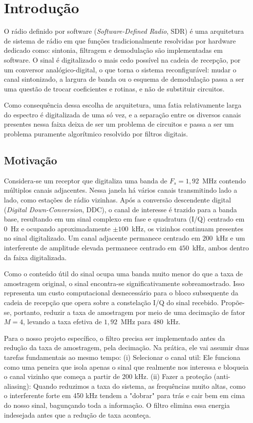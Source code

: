 \chapter{Introdução}
\label{sec:introducao}

O rádio definido por software (\textit{Software-Defined Radio}, SDR) é uma arquitetura de sistema de rádio em que funções tradicionalmente resolvidas por hardware dedicado como: sintonia, filtragem e demodulação são implementadas em software. O sinal é digitalizado o mais cedo possível na cadeia de recepção, por um conversor analógico-digital, o que torna o sistema reconfigurável: mudar o canal sintonizado, a largura de banda ou o esquema de demodulação passa a ser uma questão de trocar coeficientes e rotinas, e não de substituir circuitos.

Como consequência dessa escolha de arquitetura, uma fatia relativamente larga do espectro é digitalizada de uma só vez, e a separação entre os diversos canais presentes nessa faixa deixa de ser um problema de circuitos e passa a ser um problema puramente algorítmico resolvido por filtros digitais.

\section{Motivação}

Considera-se um receptor que digitaliza uma banda de $F_s = 1{,}92$~MHz contendo múltiplos canais adjacentes. Nessa janela há vários canais transmitindo lado a lado, como estações de rádio vizinhas. Após a conversão descendente digital (\textit{Digital Down-Conversion}, DDC), o canal de interesse é trazido para a banda base, resultando em um sinal complexo em fase e quadratura (I/Q) centrado em $0$~Hz e ocupando aproximadamente $\pm 100$~kHz, os vizinhos continuam presentes no sinal digitalizado. Um canal adjacente permanece centrado em $200$~kHz e um interferente de amplitude elevada permanece centrado em $450$~kHz, ambos dentro da faixa digitalizada.

Como o conteúdo útil do sinal ocupa uma banda muito menor do que a taxa de amostragem original, o sinal encontra-se significativamente sobreamostrado. Isso representa um custo computacional desnecessário para o bloco subsequente da cadeia de recepção que opera sobre a constelação I/Q do sinal recebido. Propõe-se, portanto, reduzir a taxa de amostragem por meio de uma decimação de fator $M = 4$, levando a taxa efetiva de $1{,}92$~MHz para $480$~kHz.

Para o nosso projeto específico, o filtro precisa ser implementado antes da redução da taxa de amostragem, pela decimação. Na prática, ele vai assumir duas tarefas fundamentais ao mesmo tempo: (i) Selecionar o canal util: Ele funciona como uma peneira que isola apenas o sinal que realmente nos interessa e bloqueia o canal vizinho que começa a partir de 200 kHz. (ii) Fazer a proteção (anti-aliasing): Quando reduzimos a taxa do sistema, as frequências muito altas, como o interferente forte em 450 kHz tendem a "dobrar" para trás e cair bem em cima do nosso sinal, bagunçando toda a informação. O filtro elimina essa energia indesejada antes que a redução de taxa aconteça.

